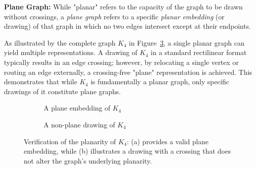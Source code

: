 \textbf{Plane Graph:} While "planar" refers to the capacity of the graph to be drawn without crossings, a \textit{plane graph} refers to a specific \textit{planar embedding} (or drawing) of that graph in which no two edges intersect except at their endpoints. 

As illustrated by the complete graph $K_4$ in Figure~\ref{fig:k4_example}, a single planar graph can yield multiple representations. A drawing of $K_4$ in a standard rectilinear format typically results in an edge crossing; however, by relocating a single vertex or routing an edge externally, a crossing-free "plane" representation is achieved. This demonstrates that while $K_4$ is fundamentally a planar graph, only specific drawings of it constitute plane graphs.

\begin{figure}
\centering
\begin{subfigure}[t]{0.45\linewidth}
\centering
{}
\caption{A plane embedding of $K_4$}
\label{fig:k4_planar}
\end{subfigure}
\hfill
\begin{subfigure}[t]{0.45\linewidth}
\centering
{}
\caption{A non-plane drawing of $K_4$}
\label{fig:k4_nonplanar}
\end{subfigure}
\caption{Verification of the planarity of $K_4$: (a) provides a valid plane embedding, while (b) illustrates a drawing with a crossing that does not alter the graph's underlying planarity.}
\label{fig:k4_example}
\end{figure}


